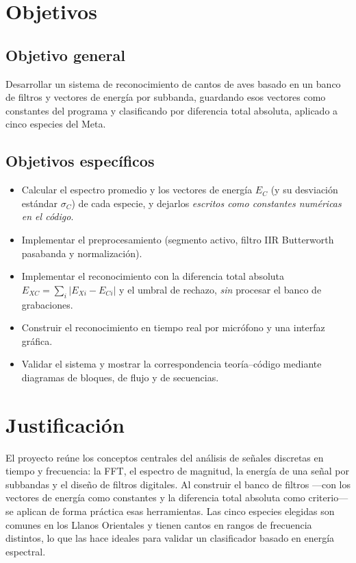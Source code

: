 \documentclass[conference]{IEEEtran}
\begin{document}
\section{Objetivos}\label{sec:objetivos}
\subsection{Objetivo general}
Desarrollar un sistema de reconocimiento de cantos de aves basado en un banco de
filtros y vectores de energía por subbanda, guardando esos vectores como
constantes del programa y clasificando por diferencia total absoluta, aplicado a
cinco especies del Meta.

\subsection{Objetivos específicos}
\begin{itemize}
  \item Calcular el espectro promedio y los vectores de energía $E_C$ (y su
        desviación estándar $\sigma_C$) de cada especie, y dejarlos
        \emph{escritos como constantes numéricas en el código}.
  \item Implementar el preprocesamiento (segmento activo, filtro IIR Butterworth
        pasabanda y normalización).
  \item Implementar el reconocimiento con la diferencia total absoluta
        $E_{XC}=\sum_i\lvert E_{Xi}-E_{Ci}\rvert$ y el umbral de rechazo,
        \emph{sin} procesar el banco de grabaciones.
  \item Construir el reconocimiento en tiempo real por micrófono y una interfaz
        gráfica.
  \item Validar el sistema y mostrar la correspondencia teoría--código mediante
        diagramas de bloques, de flujo y de secuencias.
\end{itemize}

\section{Justificación}\label{sec:justificacion}
El proyecto reúne los conceptos centrales del análisis de señales discretas en
tiempo y frecuencia: la FFT, el espectro de magnitud, la energía de una señal por
subbandas y el diseño de filtros digitales. Al construir el banco de filtros —con
los vectores de energía como constantes y la diferencia total absoluta como
criterio— se aplican de forma práctica esas herramientas. Las cinco especies
elegidas son comunes en los Llanos Orientales y tienen cantos en rangos de
frecuencia distintos, lo que las hace ideales para validar un clasificador basado
en energía espectral.
\end{document}
